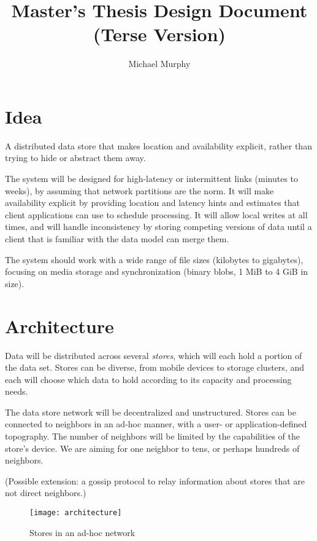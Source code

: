 \documentclass[a4paper]{article}
\newcommand{\newterm}{\textit}
\begin{document}
\title{Master's Thesis Design Document \\ (Terse Version)}
\author{Michael Murphy}
\maketitle

\section{Idea}\label{idea}

A distributed data store that makes location and availability explicit, rather
than trying to hide or abstract them away.

The system will be designed for high-latency or intermittent links (minutes to
weeks), by assuming that network partitions are the norm. It will make
availability explicit by providing location and latency hints and estimates that
client applications can use to schedule processing. It will allow local writes
at all times, and will handle inconsistency by storing competing versions of
data until a client that is familiar with the data model can merge them.

The system should work with a wide range of file sizes (kilobytes to gigabytes),
focusing on media storage and synchronization (binary blobs, 1 MiB to 4 GiB in
size).


\section{Architecture}\label{architecture}

Data will be distributed across several \newterm{stores}, which will each hold a
portion of the data set. Stores can be diverse, from mobile devices to storage
clusters, and each will choose which data to hold according to its capacity and
processing needs.

The data store network will be decentralized and unstructured. Stores can be
connected to neighbors in an ad-hoc manner, with a user- or application-defined
topography. The number of neighbors will be limited by the capabilities of the
store's device. We are aiming for one neighbor to tens, or perhaps hundreds of
neighbors.

(Possible extension: a gossip protocol to relay information about stores that
are not direct neighbors.)

\begin{figure}[h]
  \caption{Stores in an ad-hoc network}
  \label{fig:architecture}
  \centering
    \texttt{[image: architecture]}
\end{figure}
\end{document}
